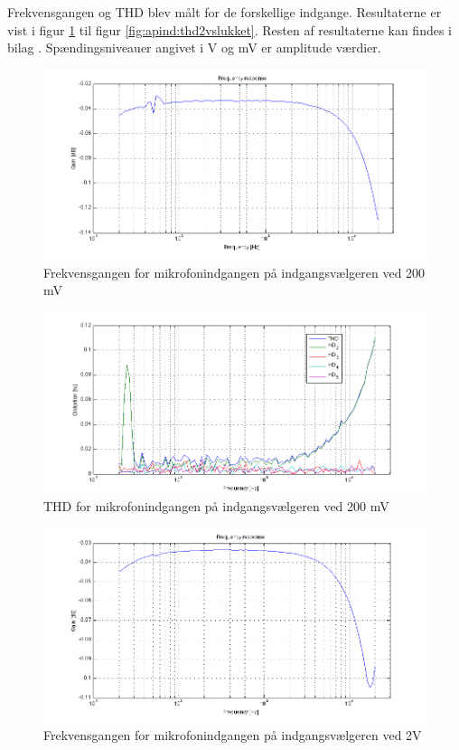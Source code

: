 Frekvensgangen og THD blev målt for de forskellige indgange. Resultaterne er vist i figur \ref{fig:apind:frek200mv} til figur \ref{fig:apind:thd2vslukket}. Resten af resultaterne kan findes i bilag \cite{indgangsvaelger-maalinng}%
. Spændingsniveauer angivet i V og mV er amplitude værdier. 

\begin{figure}[h]
\centering
\includegraphics[width=\textwidth]{maalerapporter/indgangsvaelger/Indgangsvlger-mic-200mv-frek.png}
\caption{Frekvensgangen for mikrofonindgangen på indgangsvælgeren ved 200 mV}
\label{fig:apind:frek200mv}
\end{figure}

\begin{figure}[h]
\centering
\includegraphics[width=\textwidth]{maalerapporter/indgangsvaelger/Indgangsvlger-mic-200mv-thd.png}
\caption{THD for mikrofonindgangen på indgangsvælgeren ved 200 mV}
\label{fig:apind:thd200mv}
\end{figure}

\begin{figure}[h]
\centering
\includegraphics[width=\textwidth]{maalerapporter/indgangsvaelger/Indgangsvlger-mic-2v-frek.png}
\caption{Frekvensgangen for mikrofonindgangen på indgangsvælgeren ved 2V}
\label{fig:apind:frek2v}
\end{figure}

